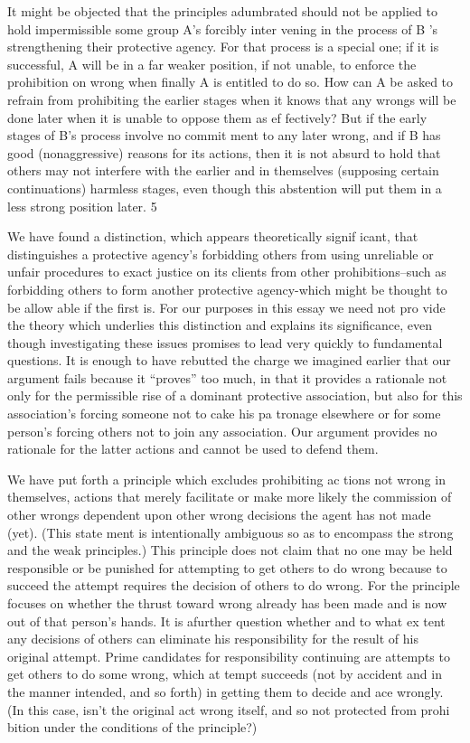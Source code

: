 \documentclass[11pt,openany]{book}
\begin{document}
It might be objected that the principles adumbrated should not be applied to hold impermissible some group A's forcibly inter vening in the process of B 's strengthening their protective agency. For that process is a special one; if it is successful, A will be in a far weaker position, if not unable, to enforce the prohibition on wrong when finally A is entitled to do so. How can A be asked to refrain from prohibiting the earlier stages when it knows that any wrongs will be done later when it is unable to oppose them as ef fectively? But if the early stages of B's process involve no commit ment to any later wrong, and if B has good (nonaggressive) reasons for its actions, then it is not absurd to hold that others may not interfere with the earlier and in themselves (supposing certain continuations) harmless stages, even though this abstention will put them in a less strong position later. 5 

We have found a distinction, which appears theoretically signif icant, that distinguishes a protective agency's forbidding others from using unreliable or unfair procedures to exact justice on its clients from other prohibitions--such as forbidding others to form another protective agency-which might be thought to be allow able if the first is. For our purposes in this essay we need not pro vide the theory which underlies this distinction and explains its significance, even though investigating these issues promises to lead very quickly to fundamental questions. It is enough to have rebutted the charge we imagined earlier that our argument fails because it ``proves'' too much, in that it provides a rationale not only for the permissible rise of a dominant protective association, but also for this association's forcing someone not to cake his pa tronage elsewhere or for some person's forcing others not to join any association. Our argument provides no rationale for the latter actions and cannot be used to defend them. 

We have put forth a principle which excludes prohibiting ac tions not wrong in themselves, actions that merely facilitate or make more likely the commission of other wrongs dependent upon other wrong decisions the agent has not made (yet). (This state ment is intentionally ambiguous so as to encompass the strong and the weak principles.) This principle does not claim that no one may be held responsible or be punished for attempting to get others to do wrong because to succeed the attempt requires the decision of others to do wrong. For the principle focuses on whether the thrust toward wrong already has been made and is now out of that person's hands. It is afurther question whether and to what ex tent any decisions of others can eliminate his responsibility for the result of his original attempt. Prime candidates for responsibility continuing are attempts to get others to do some wrong, which at tempt succeeds (not by accident and in the manner intended, and so forth) in getting them to decide and ace wrongly. (In this case, isn't the original act wrong itself, and so not protected from prohi bition under the conditions of the principle?) 
\end{document}
